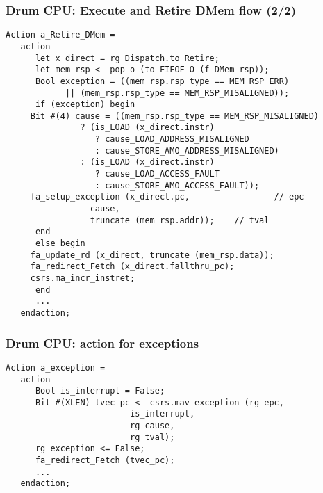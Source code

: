 \begin{frame}[fragile]
\frametitle{Drum CPU: Execute and Retire DMem flow (2/2)}

\footnotesize

\begin{minipage}{0.725\textwidth}\scriptsize
\begin{Verbatim}[frame=single, label=From src\_Drum/CPU.bsv]
   Action a_Retire_DMem =
   action
      let x_direct = rg_Dispatch.to_Retire;
      let mem_rsp <- pop_o (to_FIFOF_O (f_DMem_rsp));
      Bool exception = ((mem_rsp.rsp_type == MEM_RSP_ERR)
			|| (mem_rsp.rsp_type == MEM_RSP_MISALIGNED));
      if (exception) begin
	 Bit #(4) cause = ((mem_rsp.rsp_type == MEM_RSP_MISALIGNED)
			   ? (is_LOAD (x_direct.instr)
			      ? cause_LOAD_ADDRESS_MISALIGNED
			      : cause_STORE_AMO_ADDRESS_MISALIGNED)
			   : (is_LOAD (x_direct.instr)
			      ? cause_LOAD_ACCESS_FAULT
			      : cause_STORE_AMO_ACCESS_FAULT));
	 fa_setup_exception (x_direct.pc,                 // epc
			     cause,
			     truncate (mem_rsp.addr));    // tval
      end
      else begin
	 fa_update_rd (x_direct, truncate (mem_rsp.data));
	 fa_redirect_Fetch (x_direct.fallthru_pc);
	 csrs.ma_incr_instret;
      end
      ...
   endaction;
\end{Verbatim}
\end{minipage}

\end{frame}


\begin{frame}[fragile]
\frametitle{Drum CPU: action for exceptions}

\footnotesize

\begin{minipage}{0.725\textwidth}
\begin{Verbatim}[frame=single, label=From src\_Drum/CPU.bsv]
   Action a_exception =
   action
      Bool is_interrupt = False;
      Bit #(XLEN) tvec_pc <- csrs.mav_exception (rg_epc,
						 is_interrupt,
						 rg_cause,
						 rg_tval);
      rg_exception <= False;
      fa_redirect_Fetch (tvec_pc);
      ...
   endaction;
\end{Verbatim}
\end{minipage}

\end{frame}


